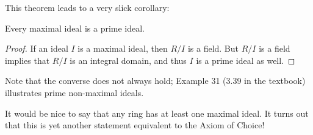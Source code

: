 \documentclass[math1530-lecture-notes]{subfiles}
\begin{document}
This theorem leads to a very slick corollary:
\begin{corollary}[]{}
  Every maximal ideal is a prime ideal.
\end{corollary}
\begin{proof}[Proof]
  If an ideal $I$ is a maximal ideal, then $R / I$ is a field. But $R / I$ is a field implies that
  $R / I$ is an integral domain, and thus $I$ is a prime ideal as well.
\end{proof}
Note that the converse does not always hold; Example 31 (3.39 in the textbook) illustrates prime
non-maximal ideals.
\begin{remark}
  It would be nice to say that any ring has at least one maximal ideal. It turns out that this is
  yet another statement equivalent to the Axiom of Choice!
\end{remark}
\end{document}
